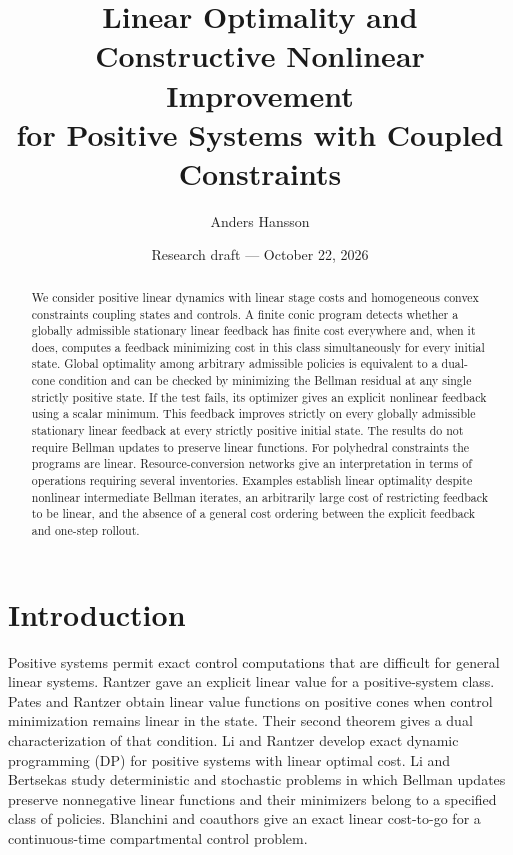 \documentclass[10pt]{article}
\title{Linear Optimality and Constructive Nonlinear Improvement\\
for Positive Systems with Coupled Constraints}
\author{Anders Hansson}
\date{Research draft --- October 22, 2026}
\begin{document}
\maketitle

\begin{abstract}
We consider positive linear dynamics with linear stage costs and homogeneous convex constraints coupling states and controls. A finite conic program detects whether a globally admissible stationary linear feedback has finite cost everywhere and, when it does, computes a feedback minimizing cost in this class simultaneously for every initial state. Global optimality among arbitrary admissible policies is equivalent to a dual-cone condition and can be checked by minimizing the Bellman residual at any single strictly positive state. If the test fails, its optimizer gives an explicit nonlinear feedback using a scalar minimum. This feedback improves strictly on every globally admissible stationary linear feedback at every strictly positive initial state. The results do not require Bellman updates to preserve linear functions. For polyhedral constraints the programs are linear. Resource-conversion networks give an interpretation in terms of operations requiring several inventories. Examples establish linear optimality despite nonlinear intermediate Bellman iterates, an arbitrarily large cost of restricting feedback to be linear, and the absence of a general cost ordering between the explicit feedback and one-step rollout.
\end{abstract}

\section{Introduction}

Positive systems permit exact control computations that are difficult for general linear systems. Rantzer \cite{rantzer-2022} gave an explicit linear value for a positive-system class. Pates and Rantzer \cite{pates-rantzer} obtain linear value functions on positive cones when control minimization remains linear in the state. Their second theorem gives a dual characterization of that condition. Li and Rantzer \cite{li-rantzer} develop exact dynamic programming (DP) for positive systems with linear optimal cost. Li and Bertsekas \cite{li-bertsekas} study deterministic and stochastic problems in which Bellman updates preserve nonnegative linear functions and their minimizers belong to a specified class of policies. Blanchini and coauthors \cite{blanchini-2023} give an exact linear cost-to-go for a continuous-time compartmental control problem.
\end{document}
